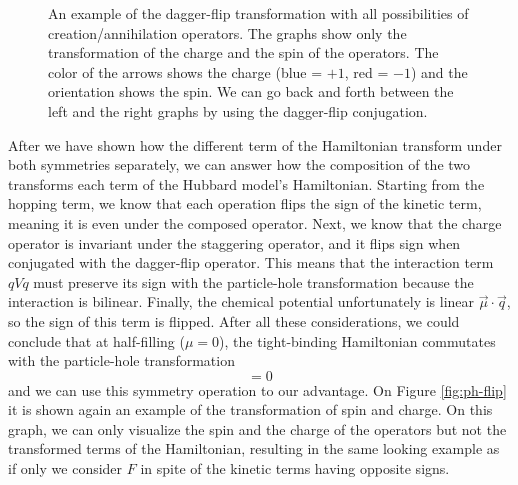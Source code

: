 \begin{figure}
\begin{center}
  \end{center}
  \caption{An example of the dagger-flip transformation with all possibilities of creation/annihilation operators. The graphs show only the transformation of the charge and the spin of the operators. The color of the arrows shows the charge (blue = $+1$, red = $-1$) and the orientation shows the spin. We can go back and forth between the left and the right graphs by using the dagger-flip conjugation.}
  \label{fig:dagger-flip}
\end{figure}

After we have shown how the different term of the Hamiltonian transform under both symmetries separately, we can answer how the composition of the two transforms each term of the Hubbard model's Hamiltonian. Starting from the hopping term, we know that each operation flips the sign of the kinetic term, meaning it is even under the composed operator. Next, we know that the charge operator is invariant under the staggering operator, and it flips sign when conjugated with the dagger-flip operator. This means that the interaction term $qVq$ must preserve its sign with the particle-hole transformation because the interaction is bilinear. Finally, the chemical potential unfortunately is linear $\vec{\mu}\cdot \vec{q}$, so the sign of this term is flipped. After all these considerations, we could conclude that at half-filling ($\mu = 0$), the tight-binding Hamiltonian commutates with the particle-hole transformation
\begin{equation}
  [H, XF] = 0
\end{equation} 
and we can use this symmetry operation to our advantage. On Figure \ref{fig:ph-flip} it is shown again an example of the transformation of spin and charge. On this graph, we can only visualize the spin and the charge of the operators but not the transformed terms of the Hamiltonian, resulting in the same looking example as if only we consider $F$ in spite of the kinetic terms having opposite signs.

